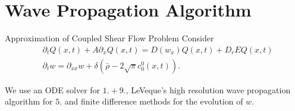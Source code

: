 \section{Wave Propagation Algorithm}

\begin{frame}{Approximation of Coupled Shear Flow Problem}
	\scriptsize
	Consider
	\begin{equation}
		\begin{split}
			&\partial_t Q(x,t) + A\partial_x Q(x,t) =  D(w_x)Q(x,t)+ D_rEQ(x,t) \\
			&\partial_{t}w = \partial_{xx}w + \delta(\bar{\rho}-2\sqrt{\pi} c^0_0(x,t)).
		\end{split}
		\label{coupledsys_1d}
	\end{equation}
	\begin{table}[h]
		\centering
		\renewcommand{\arraystretch}{1.3}
		\caption{Splitting algorithm for solving the coupled shear flow problem (Dahm et al.)}
	\end{table}
	We use an ODE solver for $1.+9.$, LeVeque’s high resolution wave propagation algorithm for $5.$ and finite difference methods for the evolution of $w$.
\end{frame}

